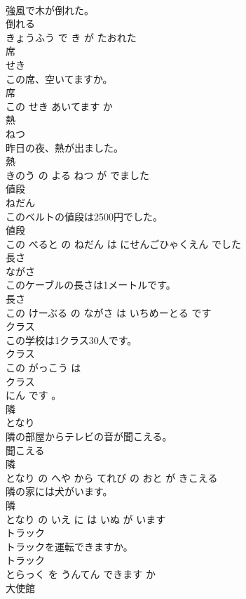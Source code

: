 \documentclass[8pt]{extreport}
\begin{document}
\begin{CJK}{UTF8}{min}
\\	強風で木が倒れた。	
\\	倒れる 
\\	きょうふう で き が たおれた			
\\	席	
\\	せき			
\\	この席、空いてますか。	
\\	席 
\\	この せき あいてます か			
\\	熱	
\\	ねつ			
\\	昨日の夜、熱が出ました。	
\\	熱 
\\	きのう の よる ねつ が でました			
\\	値段	
\\	ねだん			
\\	このベルトの値段は2500円でした。	
\\	値段 
\\	この べると の ねだん は にせんごひゃくえん でした			
\\	長さ	
\\	ながさ			
\\	このケーブルの長さは1メートルです。	
\\	長さ 
\\	この けーぶる の ながさ は いちめーとる です			
\\	クラス	
\\	この学校は1クラス30人です。	
\\	クラス 
\\	この がっこう は 
\\	クラス 
\\	にん です 。			
\\	隣	
\\	となり			
\\	隣の部屋からテレビの音が聞こえる。	
\\	聞こえる 
\\	隣 
\\	となり の へや から てれび の おと が きこえる			
\\	隣の家には犬がいます。	
\\	隣 
\\	となり の いえ に は いぬ が います			
\\	トラック	
\\	トラックを運転できますか。	
\\	トラック 
\\	とらっく を うんてん できます か			
\\	大使館	

\end{CJK}
\end{document}
